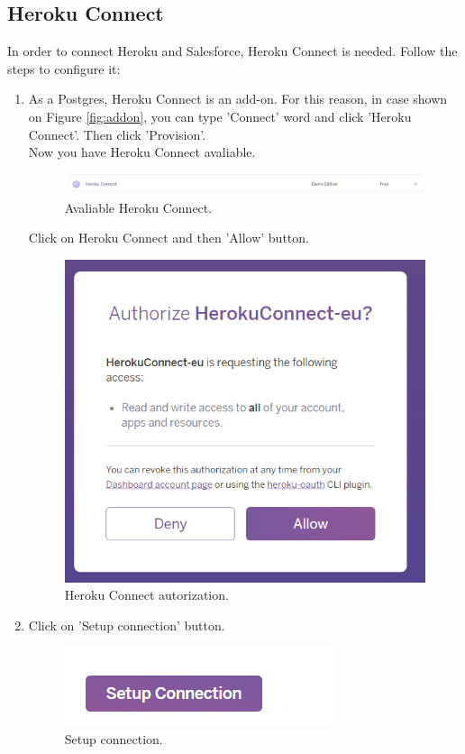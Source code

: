 \documentclass[12pt,a4paper]{article}
\begin{document}
\subsection{Heroku Connect}
In order to connect Heroku and Salesforce, Heroku Connect is needed. Follow the steps to configure it:
\begin{enumerate}
	
 \item As a Postgres, Heroku Connect is an add-on. For this reason, in case shown on Figure \ref{fig:addon}, you can type 'Connect' word and click 'Heroku Connect'. Then click 'Provision'.\\
Now you have Heroku Connect avaliable.
\begin{figure}[H]
	\centering
	\includegraphics[width=1\textwidth]{images/connect1.PNG}
	\caption{Avaliable Heroku Connect.}
	\label{fig:cona}
\end{figure}
Click on Heroku Connect and then 'Allow' button.
\begin{figure}[H]
	\centering
	\includegraphics{images/autconn.PNG}
	\caption{Heroku Connect autorization.}
	\label{fig:auto}
\end{figure}


\item Click on 'Setup connection' button.
\begin{figure}[H]
	\centering
	\includegraphics{images/connect2.PNG}
	\caption{Setup connection.}
	\label{fig:conb}
\end{figure}


\end{enumerate}
\end{document}
